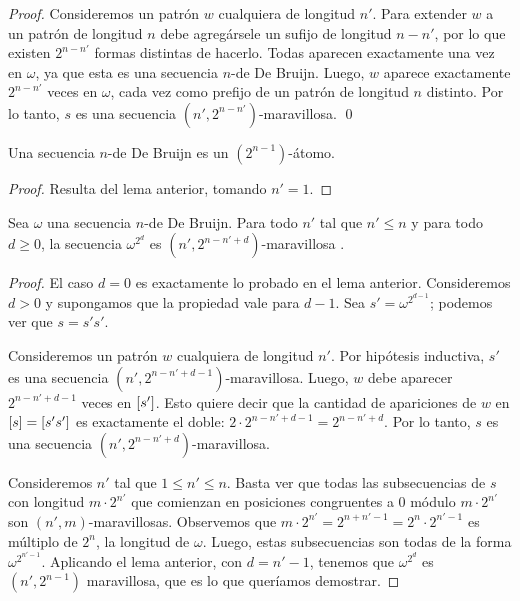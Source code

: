 \documentclass[11pt]{article}
\begin{document}

\begin{proof}
	Consideremos un patrón $w$ cualquiera de longitud $n'$. Para extender $w$ a
	un patrón de longitud $n$ debe agregársele un sufijo de longitud $n-n'$, por
	lo que existen $2^{n-n'}$ formas distintas de hacerlo. Todas
	aparecen exactamente una vez en $\omega$, ya que esta es
	una secuencia $n$-de De Bruijn. Luego, $w$ aparece exactamente $2^{n-n'}$
	veces en $\omega$, cada vez como prefijo de un patrón de longitud $n$
	distinto. Por lo tanto, $s$ es una secuencia $(n',2^{n-n'})$-maravillosa.
	\qed
\end{proof}

\begin{corollary}
	Una secuencia $n$-de De Bruijn es un $(2^{n-1})$-átomo.
\end{corollary}

\begin{proof}
	Resulta del lema anterior, tomando $n' = 1$.
\end{proof}


\begin{lemma}
	Sea $\omega$ una secuencia $n$-de De Bruijn.
	Para todo $n'$ tal que $n' \leq n$ y para todo $d \geq 0$, la
	secuencia $\omega^{2^d}$ es $(n',2^{n-n'+d})$-maravillosa .

\end{lemma}

\begin{proof}
	El caso $d = 0$ es exactamente lo probado en el lema anterior.
	Consideremos $d > 0$ y supongamos que la propiedad vale para $d - 1$.
	Sea $s' = \omega^{2^{d-1}}$; podemos ver que $s = s's'$.

	Consideremos un patrón $w$ cualquiera de longitud $n'$. Por hipótesis
	inductiva, $s'$ es una secuencia $(n',2^{n-n'+d-1})$-maravillosa. Luego, $w$
	debe aparecer $2^{n-n'+d-1}$ veces en $\left[s'\right]$.
	Esto quiere decir que la cantidad de apariciones de $w$ en $\left[s\right] =
		\left[s's'\right]$ es exactamente el doble: $2 \cdot 2^{n-n'+d-1} = 2^{n-n'+d}$.
	Por lo tanto, $s$ es una secuencia $(n',2^{n-n'+d})$-maravillosa.

	Consideremos $n'$ tal que $1 \leq n' \leq n$. Basta ver que todas las
	subsecuencias de $s$ con longitud $m \cdot 2^{n'}$ que comienzan en
	posiciones congruentes a $0$ módulo $m \cdot 2^{n'}$ son
	$(n',m)$-maravillosas. Observemos que $m \cdot 2^{n'} = 2^{n+n'-1} = 2^n
		\cdot 2^{n'-1}$ es múltiplo de $2^n$, la longitud de $\omega$.
	Luego, estas subsecuencias son todas de la forma $\omega^{2^{n'-1}}$.
	Aplicando el lema anterior, con $d = n'-1$, tenemos que $\omega^{2^d}$
	es $(n',2^{n-1})$ maravillosa, que es lo que queríamos demostrar.
\end{proof}
\end{document}
